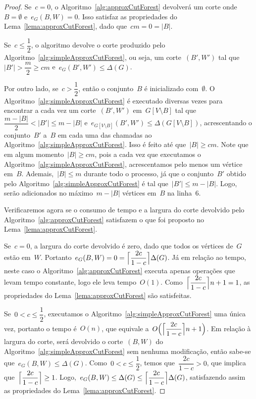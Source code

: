 \begin{proof}
	Se~${c=0}$, o Algoritmo~\ref{alg:approxCutForest} devolverá
	um corte onde~${B=\emptyset}$ e~${e_G(B,W) = 0}$. 
	Isso satisfaz as 
	propriedades do Lema~\ref{lema:approxCutForest}, dado 
	que~${cm=0=|B|}$.

	Se~${c \le \dfrac{1}{2}}$, o algoritmo 
	devolve o corte produzido pelo 
	Algoritmo~\ref{alg:simpleApproxCutForest}, ou seja,
	um corte~$(B',W')$ tal 
	que~${|B'|>\dfrac{m}{2}\ge cm}$ e~${e_G(B',W')\le \Delta(G)}$.

	Por outro lado, se~${c>\dfrac{1}{2}}$, então
	o conjunto~$B$ é inicializado com~$\emptyset$.
	O Algoritmo~\ref{alg:simpleApproxCutForest} é
	executado diversas vezes para encontrar a cada vez
	um corte~$(B',W')$ em~${G[V\setminus B]}$ 
	tal que~${\dfrac{m-|B|}{2}<|B'|\le m-|B|}$ 
	e~${e_{G[V\setminus B]}(B',W')\le\Delta(G[V\setminus B])}$, 
	acrescentando o 
	conjunto~$B'$ a~$B$ em cada uma das chamadas ao 
	Algoritmo~\ref{alg:simpleApproxCutForest}.
	Isso é feito até que~${|B|\ge cm}$.
	Note que em algum momento~${|B|\ge cm}$, pois a 
	cada vez que executamos o 
	Algoritmo~\ref{alg:simpleApproxCutForest}, acrescentamos pelo 
	menos um vértice em~$B$.
	Ademais,~${|B|\le m}$ durante todo o processo, já que o
	conjunto~$B'$ obtido 
	pelo Algoritmo~\ref{alg:simpleApproxCutForest} 
	é tal que~$|B'|\le m-|B|$. Logo, serão adicionados no 
	máximo~${m-|B|}$ vértices em~$B$ na linha~6.
	
	\bigskip
	
	Verificaremos agora se o consumo de tempo e a largura do corte
	devolvido pelo Algoritmo~\ref{alg:approxCutForest} satisfazem
	o que foi proposto no Lema~\ref{lema:approxCutForest}.
	
	Se~${c=0}$, a largura do corte devolvido é zero,
	dado que todos os vértices de~$G$ estão em~$W$.
	Portanto~${e_G(B,W)=0=\ceil[\Big]{\dfrac{2c}{1-c}} \Delta(G)}$.
	Já em relação ao tempo, neste caso o Algoritmo~\ref{alg:approxCutForest}
	executa apenas operações que levam tempo constante, logo ele
	leva tempo~$O(1)$. 
	Como~${\ceil[\Big]{\dfrac{2c}{1-c}} n+1 = 1}$,
	as propriedades do Lema~\ref{lema:approxCutForest} são
	satisfeitas.

	Se~${0<c\le \dfrac{1}{2}}$, executamos o
	Algoritmo~\ref{alg:simpleApproxCutForest} uma única vez, 
	portanto o tempo é~$O(n)$, que equivale 
	a~${O\Big(\ceil[\Big]{\dfrac{2c}{1-c}} n+1\Big)}$.
	Em relação à largura do corte, será devolvido o corte~$(B,W)$ do 
	Algoritmo~\ref{alg:simpleApproxCutForest} sem nenhuma 
	modificação, então sabe-se que~${e_G(B,W)\le \Delta(G)}$.
	Como~${0<c\le\dfrac{1}{2}}$, temos que~${\dfrac{2c}{1-c}>0}$, 
	que implica que~${\ceil[\Big]{ \dfrac{2c}{1-c}}\ge 1}$.
	Logo,~${e_G(B,W)\le\Delta(G)\le \ceil[\Big]{\dfrac{2c}{1-c}}
	\Delta(G)}$, 
	satisfazendo assim as propriedades do 
	Lema~\ref{lema:approxCutForest}.


\end{proof}

